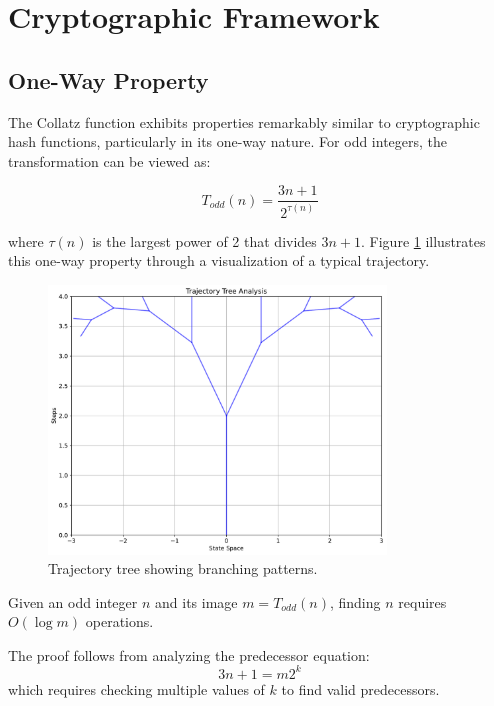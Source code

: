 \section{Cryptographic Framework}\label{sec:crypto_framework}

\subsection{One-Way Property}

The Collatz function exhibits properties remarkably similar to cryptographic hash functions, particularly in its one-way nature. For odd integers, the transformation can be viewed as:

\[
T_{odd}(n) = \frac{3n + 1}{2^{\tau(n)}}
\]

where $\tau(n)$ is the largest power of 2 that divides $3n + 1$. Figure \ref{fig:trajectory_tree} illustrates this one-way property through a visualization of a typical trajectory.

\begin{figure}[h]
\centering
\includegraphics[width=0.8\textwidth]{py_visuals/figures/trajectory_tree.pdf}
\caption{Trajectory tree showing branching patterns.}
\label{fig:trajectory_tree}
\end{figure}

\begin{theorem}\label{thm:one_way}
Given an odd integer $n$ and its image $m = T_{odd}(n)$, finding $n$ requires $O(\log m)$ operations.
\end{theorem}

The proof follows from analyzing the predecessor equation:
\[
3n + 1 = m2^k
\]
which requires checking multiple values of $k$ to find valid predecessors.

